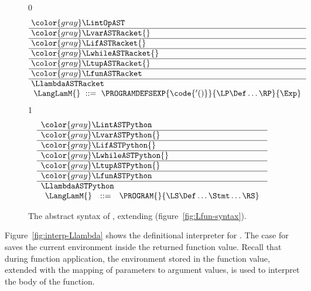 \documentclass[7x10]{TimesAPriori_MIT}%
\newcommand{\gray}[1]{{\color{gray} #1}}
\def\racketEd{0}
\def\pythonEd{1}
\def\edition{1}
\newcommand{\pythonColor}[0]{}
\numberwithin{theorem}{chapter}
\numberwithin{definition}{chapter}
\numberwithin{equation}{chapter}
\begin{document}
\begin{figure}[tp]
\centering
\begin{tcolorbox}[colback=white]
    \small
{\if\edition\racketEd
\[\arraycolsep=3pt
\begin{array}{l}
  \gray{\LintOpAST} \\ \hline
  \gray{\LvarASTRacket{}} \\ \hline
  \gray{\LifASTRacket{}} \\ \hline
  \gray{\LwhileASTRacket{}} \\ \hline
  \gray{\LtupASTRacket{}} \\ \hline
  \gray{\LfunASTRacket} \\ \hline
  \LlambdaASTRacket \\
  \begin{array}{lcl}
  \LangLamM{} &::=& \PROGRAMDEFSEXP{\code{'()}}{\LP\Def\ldots\RP}{\Exp}
  \end{array}
\end{array}
\]
\fi}
{\if\edition\pythonEd\pythonColor
\[
\begin{array}{l}
  \gray{\LintASTPython} \\ \hline
  \gray{\LvarASTPython{}} \\ \hline
  \gray{\LifASTPython{}} \\ \hline
  \gray{\LwhileASTPython{}} \\ \hline
  \gray{\LtupASTPython{}} \\ \hline
  \gray{\LfunASTPython} \\ \hline
  \LlambdaASTPython \\
  \begin{array}{lcl}
  \LangLamM{} &::=& \PROGRAM{}{\LS \Def \ldots \Stmt \ldots \RS}
  \end{array}
\end{array}
\]
\fi}
\end{tcolorbox}

\caption{The abstract syntax of \LangLam{}, extending \LangFun{} (figure~\ref{fig:Lfun-syntax}).}
\label{fig:Llam-syntax}
\end{figure}

Figure~\ref{fig:interp-Llambda} shows the definitional
interpreter for \LangLam{}. The case for
 saves the current environment inside the returned
function value. Recall that during function application, the
environment stored in the function value, extended with the mapping of
parameters to argument values, is used to interpret the body of the
function.
\end{document}
